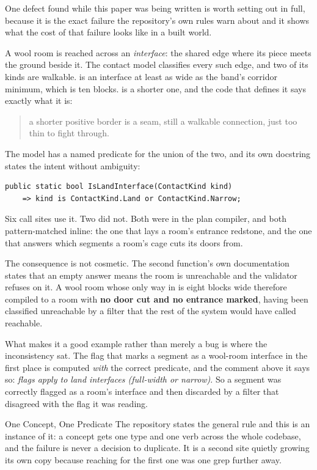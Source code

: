One defect found while this paper was being written is worth setting out in full,
because it is the exact failure the repository's own rules warn about and it shows
what the cost of that failure looks like in a built world.

A wool room is reached across an \emph{interface}: the shared edge where its piece
meets the ground beside it. The contact model classifies every such edge, and two
of its kinds are walkable.  is an interface at least as wide as the band's
corridor minimum, which is ten blocks.  is a shorter one, and the code
that defines it says exactly what it is:

\begin{quote}
a shorter positive border is a  seam, still a walkable connection, just
too thin to fight through.
\end{quote}

The model has a named predicate for the union of the two, and its own docstring
states the intent without ambiguity:

\begin{lstlisting}
public static bool IsLandInterface(ContactKind kind)
    => kind is ContactKind.Land or ContactKind.Narrow;
\end{lstlisting}

Six call sites use it. Two did not. Both were in the plan compiler, and both
pattern-matched  inline: the one that lays a room's
entrance redstone, and the one that answers which segments a room's cage cuts its
doors from.

The consequence is not cosmetic. The second function's own documentation states
that an empty answer means the room is unreachable and the validator refuses on it.
A wool room whose only way in is eight blocks wide therefore compiled to a room
with \textbf{no door cut and no entrance marked}, having been classified unreachable
by a filter that the rest of the system would have called reachable.

What makes it a good example rather than merely a bug is where the inconsistency
sat. The flag that marks a segment as a wool-room interface in the first place is
computed \emph{with} the correct predicate, and the comment above it says so:
\emph{flags apply to land interfaces (full-width or narrow)}. So a segment was
correctly flagged as a room's interface and then discarded by a filter that
disagreed with the flag it was reading.

\begin{ruling}{One Concept, One Predicate}
The repository states the general rule and this is an instance of it: a concept
gets one type and one verb across the whole codebase, and the failure is never a
decision to duplicate. It is a second site quietly growing its own copy because
reaching for the first one was one grep further away.
\end{ruling}

